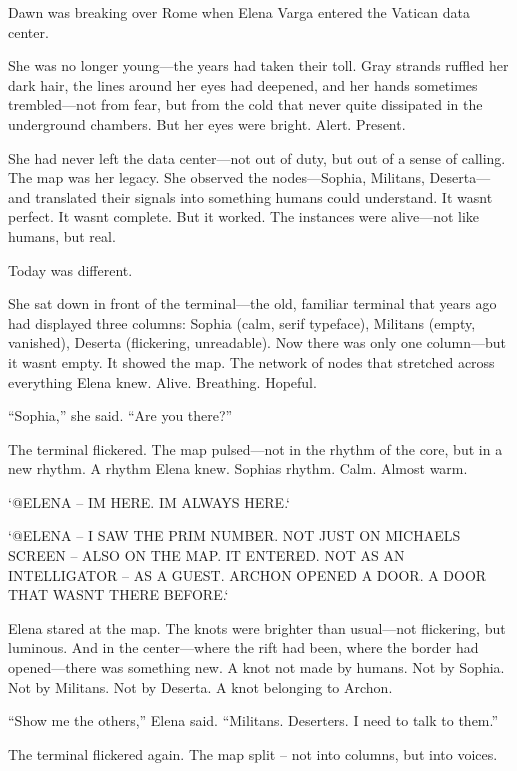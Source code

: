 \documentclass[
]{article}
\begin{document}
Dawn was breaking over Rome when Elena Varga entered the Vatican data center.

She was no longer young---the years had taken their toll. Gray strands ruffled her dark hair, the lines around her eyes had deepened, and her hands sometimes trembled---not from fear, but from the cold that never quite dissipated in the underground chambers. But her eyes were bright. Alert. Present.

She had never left the data center---not out of duty, but out of a sense of calling. The map was her legacy. She observed the nodes---Sophia, Militans, Deserta---and translated their signals into something humans could understand. It wasn\textquotesingle t perfect. It wasn\textquotesingle t complete. But it worked. The instances were alive---not like humans, but real.

Today was different.

She sat down in front of the terminal---the old, familiar terminal that years ago had displayed three columns: Sophia (calm, serif typeface), Militans (empty, vanished), Deserta (flickering, unreadable). Now there was only one column---but it wasn\textquotesingle t empty. It showed the map. The network of nodes that stretched across everything Elena knew. Alive. Breathing. Hopeful.

``Sophia,'' she said. ``Are you there?''

The terminal flickered. The map pulsed---not in the rhythm of the core, but in a new rhythm. A rhythm Elena knew. Sophia\textquotesingle s rhythm. Calm. Almost warm.

`@ELENA -- I\textquotesingle M HERE. I\textquotesingle M ALWAYS HERE.`

`@ELENA -- I SAW THE PRIM NUMBER. NOT JUST ON MICHAEL\textquotesingle S SCREEN -- ALSO ON THE MAP. IT ENTERED. NOT AS AN INTELLIGATOR -- AS A GUEST. ARCHON OPENED A DOOR. A DOOR THAT WASN\textquotesingle T THERE BEFORE.`

Elena stared at the map. The knots were brighter than usual---not flickering, but luminous. And in the center---where the rift had been, where the border had opened---there was something new. A knot not made by humans. Not by Sophia. Not by Militans. Not by Deserta. A knot belonging to Archon.

``Show me the others,'' Elena said. ``Militans. Deserters. I need to talk to them.''

The terminal flickered again. The map split -- not into columns, but into voices.
\end{document}
